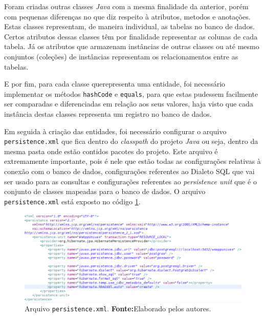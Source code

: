 		\par Foram criadas outras classes \textit{Java} com a mesma finalidade da
	anterior, porém com pequenas diferenças no que diz respeito à atributos,
	metodos e anotações. Estas classes representam, de maneira individual, as
	tabelas no banco de dados. Certos atributos dessas classes têm por finalidade
	representar as colunas de cada tabela. Já os atributos que armazenam instâncias
	de outras classes ou até mesmo conjuntos (coleções) de instâncias representam os
	relacionamentos entre as tabelas. 
	
		\par E por fim, para cada classe querepresenta uma 	entidade, foi necessário
	implementar os métodos \texttt{hashCode} e \texttt{equals}, para que estas
	pudessem facilmente ser comparadas e diferenciadas em relação aos seus
	valores, haja visto que cada instância destas classes representa um registro
	no banco de dados.
		
		\par Em seguida à criação das entidades, foi necessário configurar o arquivo
	\texttt{persistence.xml} que fica dentro do \textit{classpath} do projeto
	\textit{Java} ou seja, dentro da mesma pasta onde estão contidos pacotes do
	projeto. Este arquivo é extremamente importante, pois é nele que estão todas
	as configurações relativas à conexão com o banco de dados, configurações
	referentes ao Dialeto SQL que vai ser usado para as consultas e configurações
	referentes ao \textit{persistence unit} que é o conjunto de classes mapeadas
	para o banco de dados.	O arquivo \texttt{persistence.xml} está exposto no
	código \ref{fig:qm11}.
	
 		\begin{figure}[h!]
			\centerline{\includegraphics[scale=0.6]{./imagens/2_q_metodologico/qm11.png}}
			\caption[Arquivo \texttt{persistence.xml}]{Arquivo \texttt{persistence.xml}.
			\textbf{Fonte:}Elaborado pelos autores.}
			\label{fig:qm11}
		\end{figure}
		
